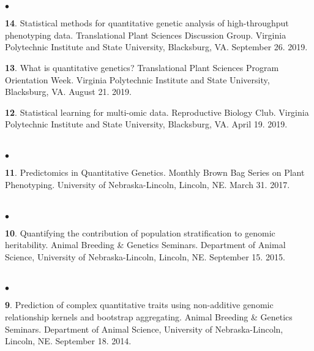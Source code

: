\documentclass[margin,line,10pt]{res}
\newenvironment{list2}{
  \begin{list}{$\bullet$}{%
      \setlength{\itemsep}{0in}
      \setlength{\parsep}{0in} \setlength{\parskip}{0in}
      \setlength{\topsep}{0in} \setlength{\partopsep}{0in} 
      \setlength{\leftmargin}{0.2in}}}{\end{list}}
\begin{document}
\begin{resume}
\section{}
\begin{list2}
\item [{\bf 14}.] Statistical methods for quantitative genetic analysis of high-throughput phenotyping data. Translational Plant Sciences Discussion Group. Virginia Polytechnic Institute and State University, Blacksburg, VA. September 26. 2019.

  \vspace{0.5cm}

\item [{\bf 13}.] What is quantitative genetics? Translational Plant Sciences Program Orientation Week. Virginia Polytechnic Institute and State University, Blacksburg, VA. August 21. 2019.
  
  \vspace{0.5cm}

\item [{\bf 12}.] Statistical learning for multi-omic data. Reproductive Biology Club. Virginia Polytechnic Institute and State University, Blacksburg, VA. April 19. 2019.
\end{list2}  

\section{}
\begin{list2}
\item [{\bf 11}.] Predictomics in Quantitative Genetics. Monthly Brown Bag Series on Plant Phenotyping. University of Nebraska-Lincoln, Lincoln, NE. March 31. 2017.
\end{list2}  

\section{}
\begin{list2}
\item  [{\bf 10}.] Quantifying the contribution of population stratification to genomic heritability. Animal Breeding \& Genetics Seminars. Department of Animal Science, University of Nebraska-Lincoln, Lincoln, NE. September 15. 2015. 
\end{list2}  

\section{}
\begin{list2}
\item  [{\bf 9}.] Prediction of complex quantitative traits using non-additive genomic relationship kernels and bootstrap aggregating. Animal Breeding \& Genetics Seminars. Department of Animal Science, University of Nebraska-Lincoln, Lincoln, NE. September 18. 2014. 
\vspace{0.5cm}


\end{list2}
\end{resume}
\end{document}

